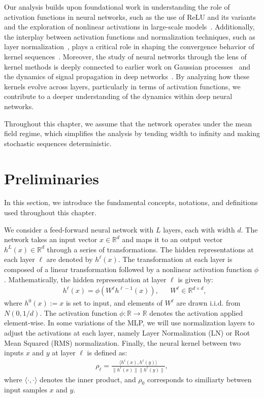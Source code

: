 Our analysis builds upon foundational work in understanding the role of activation functions in neural networks, such as the use of ReLU and its variants~\cite{glorot2011deep, nair2010rectified} and the exploration of nonlinear activations in large-scale models~\cite{ramachandran2017searching, clevert2015fast}. Additionally, the interplay between activation functions and normalization techniques, such as layer normalization~\cite{ba2016layer}, plays a critical role in shaping the convergence behavior of kernel sequences~\cite{klambauer2017self, hayou2019impact}. Moreover, the study of neural networks through the lens of kernel methods is deeply connected to earlier work on Gaussian processes~\cite{williams2006gaussian} and the dynamics of signal propagation in deep networks~\cite{poole2016exponential, raghu2017expressive}. By analyzing how these kernels evolve across layers, particularly in terms of activation functions, we contribute to a deeper understanding of the dynamics within deep neural networks.

Throughout this chapter, we assume that the network operates under the mean field regime, which simplifies the analysis by tending width to infinity and making stochastic sequences deterministic. 

\section{Preliminaries}
In this section, we introduce the fundamental concepts, notations, and definitions used throughout this chapter. 

We consider a feed-forward neural network with $L$ layers, each with width $d$. The network takes an input vector $x \in \mathbb{R}^d$ and maps it to an output vector $h^L(x) \in \mathbb{R}^d$ through a series of transformations. The hidden representations at each layer $\ell$ are denoted by $h^\ell(x)$. The transformation at each layer is composed of a linear transformation followed by a nonlinear activation function $\phi$. Mathematically, the hidden representation at layer $\ell$ is given by:
\begin{align}
& h^\ell(x) = \phi(W^\ell h^{\ell-1}(x)), && W^\ell \in \mathbb{R}^{d \times d},
\end{align}
where $h^0(x):=x$ is set to input, and elements of $W^\ell$ are drawn i.i.d. from $N(0,1/d)$. The activation function $\phi: \mathbb{R} \to \mathbb{R}$ denotes the activation applied element-wise. 
In some variations of the MLP, we will use normalization layers to adjust the activations at each layer, namely Layer Normalization (LN) or Root Mean Squared (RMS) normalization. Finally, the neural kernel between two inputs $x$ and $y$ at layer $\ell$ is defined as:
\begin{align}
    \rho_\ell = \frac{\langle h^\ell(x), h^\ell(y) \rangle}{\|h^\ell(x)\| \|h^\ell(y)\|},
\end{align}
where $\langle \cdot, \cdot \rangle$ denotes the inner product, and $\rho_0$ corresponds to similiarty between input samples $x$ and $y$.

